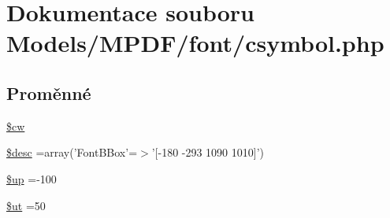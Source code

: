 \hypertarget{csymbol_8php}{\section{Dokumentace souboru Models/\-M\-P\-D\-F/font/csymbol.php}
\label{csymbol_8php}
}
\subsection*{Proměnné}
\begin{DoxyCompactItemize}
\item 
\hyperlink{csymbol_8php_ac2951b03dbb0317e6c61ec920b7479dc}{\$cw}
\item 
\hyperlink{csymbol_8php_a31059b9e4d0c5af34df20da32232ea9a}{\$desc} =array('Font\-B\-Box'=$>$'\mbox{[}-\/180 -\/293 1090 1010\mbox{]}')
\item 
\hyperlink{csymbol_8php_a6b5ad2ac55f9df46e8f34e78fbd6f176}{\$up} =-\/100
\item 
\hyperlink{csymbol_8php_aadd3f841051043ee58e587e840e8dd0b}{\$ut} =50
\end{DoxyCompactItemize}


